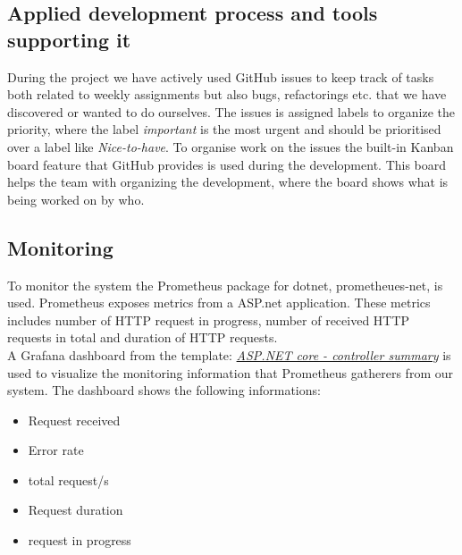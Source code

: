 \subsection{Applied development process and tools supporting it}
During the project we have actively used GitHub issues to keep track of tasks both related to weekly assignments but also bugs, refactorings etc. that we have discovered or wanted to do ourselves. The issues is assigned labels to organize the priority, where the label \textit{important} is the most urgent and should be prioritised over a label like \textit{Nice-to-have}. To organise work on the issues the built-in Kanban board feature that GitHub provides is used during the development. This board helps the team with organizing the development, where the board shows what is being worked on by who.   

\subsection{Monitoring}
To monitor the system the Prometheus package for dotnet, prometheues-net, is used. Prometheus exposes metrics from a ASP.net application. These metrics includes number of HTTP request in progress, number of received HTTP requests in total and duration of HTTP requests.
\\
A Grafana dashboard from the template: \href{https://grafana.com/grafana/dashboards/10915}{\textit{ASP.NET core - controller summary}} is used to visualize the monitoring information that Prometheus gatherers from our system. The dashboard shows the following informations:
\begin{itemize}
    \item Request received
    \item Error rate
    \item total request/s
    \item Request duration
    \item request in progress
\end{itemize}

